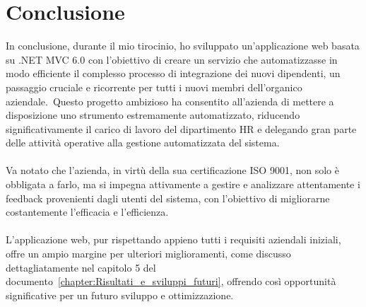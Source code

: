 \chapter*{Conclusione} %
%
In conclusione, durante il mio tirocinio, ho sviluppato un'applicazione web basata su .NET MVC 6.0 con 
l'obiettivo di creare un servizio che automatizzasse in modo efficiente il complesso 
processo di integrazione dei nuovi dipendenti, un passaggio cruciale e ricorrente per 
tutti i nuovi membri dell'organico aziendale.\ Questo progetto ambizioso ha consentito 
all'azienda di mettere a disposizione uno strumento estremamente automatizzato, riducendo 
significativamente il carico di lavoro del dipartimento HR e delegando gran parte delle 
attività operative alla gestione automatizzata del sistema.
\\ \\
Va notato che l'azienda, in virtù della sua certificazione ISO 9001, non solo è obbligata a farlo, 
ma si impegna attivamente a gestire e analizzare attentamente i feedback provenienti dagli utenti del sistema, 
con l'obiettivo di migliorarne costantemente l'efficacia e l'efficienza.
\\ \\
L'applicazione web, pur rispettando appieno tutti i requisiti aziendali iniziali, 
offre un ampio margine per ulteriori miglioramenti, come discusso dettagliatamente nel capitolo 5 del documento~\ref{chapter:Risultati_e_sviluppi_futuri}, 
offrendo così opportunità significative per un futuro sviluppo e ottimizzazione.